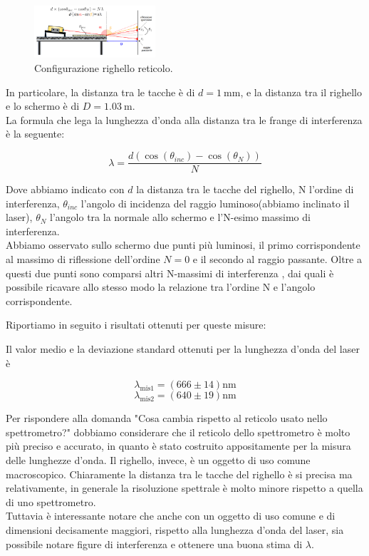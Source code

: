 \documentclass[letterpaper,12pt]{article}
\begin{document}
\begin{figure}[h!]
    \centering
    \includegraphics[width=0.4\textwidth]{Righello_config.png}
    \caption{Configurazione righello reticolo.}
    \label{fig:Righello_config}
\end{figure}

In particolare, la distanza tra le tacche è di $d = \SI{1}{\milli\meter}$, e la distanza tra il righello e lo 
schermo è di $D = \SI{1.03}{\meter}$.\\
La formula che lega la lunghezza d'onda alla distanza tra le frange di interferenza è la seguente:

\begin{equation}
    \lambda = \frac{d (\cos(\theta_{inc})-\cos(\theta_N))}{N}
    \label{eq:lunghezza_onda}
\end{equation}

Dove abbiamo indicato con $d$ la distanza tra le tacche del righello, N l'ordine di interferenza, $\theta_{inc}$ 
l'angolo di incidenza del raggio luminoso(abbiamo inclinato il laser), $\theta_N$ l'angolo tra la normale allo schermo e l'N-esimo massimo di 
interferenza.\\

Abbiamo osservato sullo schermo due punti più luminosi, il primo corrispondente al massimo di riflessione dell'ordine $N = 0$ e il secondo al raggio passante.
Oltre a questi due punti sono comparsi altri N-massimi di interferenza , dai quali è possibile ricavare allo stesso modo la relazione tra l'ordine N e l'angolo corrispondente.

Riportiamo in seguito i risultati ottenuti per queste misure:


Il valor medio e la deviazione standard ottenuti per la lunghezza d'onda del laser è 

$$ \lambda_\text{mis1}= (666 \pm 14) \text{nm}$$
$$ \lambda_\text{mis2}= (640 \pm 19) \text{nm}$$



Per rispondere alla domanda "Cosa cambia rispetto al reticolo usato nello spettrometro?" dobbiamo 
considerare che il reticolo dello spettrometro è molto più preciso e accurato, in quanto è stato costruito appositamente per 
la misura delle lunghezze d'onda. Il righello, invece, è un oggetto di uso comune macroscopico. 
Chiaramente la distanza tra le tacche del righello è si precisa ma relativamente, in generale la risoluzione spettrale 
è molto minore rispetto a quella di uno spettrometro.\\
Tuttavia è interessante notare che anche con un oggetto di uso comune e di dimensioni decisamente maggiori, rispetto alla lunghezza d'onda del laser, sia possibile 
notare figure di interferenza e ottenere una buona stima di $\lambda$.
\end{document}
